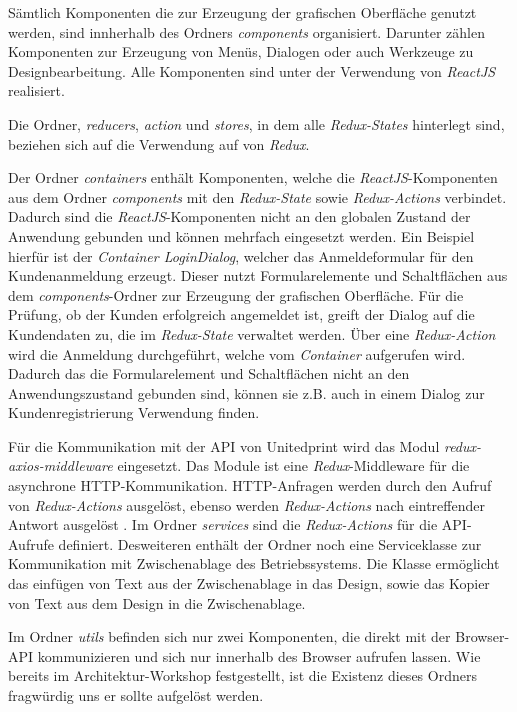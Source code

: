 Sämtlich Komponenten die zur Erzeugung der grafischen Oberfläche genutzt werden, sind innherhalb des Ordners \emph{components} organisiert. Darunter zählen Komponenten zur Erzeugung von Menüs, Dialogen oder auch Werkzeuge zu Designbearbeitung. Alle Komponenten sind unter der Verwendung von \emph{ReactJS} realisiert.

Die Ordner, \emph{reducers}, \emph{action} und \emph{stores}, in dem alle \emph{Redux-States} hinterlegt sind, beziehen sich auf die Verwendung auf von \emph{Redux}. 

Der Ordner \emph{containers} enthält Komponenten, welche die \emph{ReactJS}-Komponenten aus dem Ordner \emph{components} mit den \emph{Redux-State} sowie \emph{Redux-Actions} verbindet. 
Dadurch sind die \emph{ReactJS}-Komponenten nicht an den globalen Zustand der Anwendung gebunden und können mehrfach eingesetzt werden. Ein Beispiel hierfür ist der \emph{Container LoginDialog}, welcher das Anmeldeformular für den Kundenanmeldung erzeugt. Dieser nutzt Formularelemente und Schaltflächen aus dem \emph{components}-Ordner zur Erzeugung der grafischen Oberfläche. Für die Prüfung, ob der Kunden erfolgreich angemeldet ist, greift der Dialog auf die Kundendaten zu, die im \emph{Redux-State} verwaltet werden. Über eine \emph{Redux-Action} wird die Anmeldung durchgeführt, welche vom \emph{Container} aufgerufen wird. Dadurch das die Formularelement und Schaltflächen nicht an den Anwendungszustand gebunden sind, können sie z.B. auch in einem Dialog zur Kundenregistrierung Verwendung finden.

Für die Kommunikation mit der API von Unitedprint wird das Modul \emph{redux-axios-middleware} eingesetzt. 
Das Module ist eine \emph{Redux}-Middleware für die asynchrone HTTP-Kommunikation. HTTP-Anfragen werden durch den Aufruf von \emph{Redux-Actions} ausgelöst, ebenso werden \emph{Redux-Actions} nach eintreffender Antwort ausgelöst \autocite[vgl.][]{ReduxAxios}. Im Ordner \emph{services} sind die \emph{Redux-Actions} für die API-Aufrufe definiert. Desweiteren enthält der Ordner noch eine Serviceklasse zur Kommunikation mit Zwischenablage des Betriebssystems. Die Klasse ermöglicht das einfügen von Text aus der Zwischenablage in das Design, sowie das Kopier von Text aus dem Design in die Zwischenablage.

Im Ordner \emph{utils} befinden sich nur zwei Komponenten, die direkt mit der Browser-API kommunizieren und sich nur innerhalb des Browser aufrufen lassen. Wie bereits im Architektur-Workshop festgestellt, ist die Existenz dieses Ordners fragwürdig uns er sollte aufgelöst werden.

